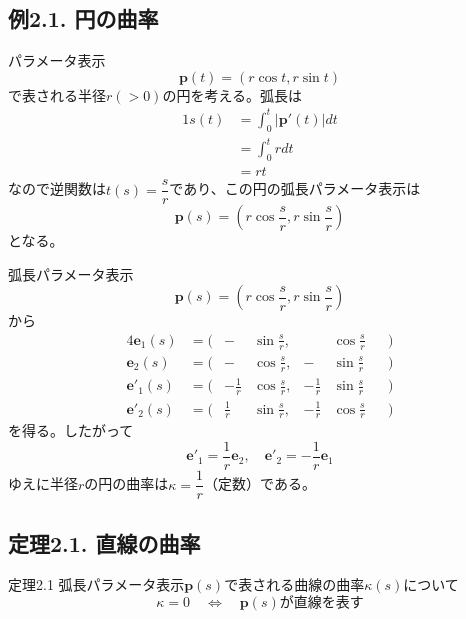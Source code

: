 \documentclass[a4j,disablejfam,dvipdfmx,papersize,slide,uplatex,21pt]{jsarticle}
\begin{document}
\subsection*{例2.1. 円の曲率}
パラメータ表示
\begin{equation}
    \bm{p}(t) = (r \cos t, r \sin t)
\end{equation}
で表される半径$r (> 0)$の円を考える。弧長は
\begin{alignat}{1}
    s(t) &= \int_0^t |\bm{p}'(t)| dt \\
        &= \int_0^t r dt \\
        &= rt
\end{alignat}
なので逆関数は$t(s) = \dfrac{s}{r}$であり、この円の弧長パラメータ表示は
\begin{equation}
    \bm{p}(s) = \left(r \cos \frac{s}{r}, r \sin \frac{s}{r}\right)
\end{equation}
となる。

\newpage
弧長パラメータ表示
\begin{equation}
    \bm{p}(s) = \left(r \cos \frac{s}{r}, r \sin \frac{s}{r}\right)
\end{equation}
から
\begin{alignat}{4}
    \bm{e}_1(s) &=  \bigl(&- &\sin \frac{s}{r},& &\cos \frac{s}{r} &&\bigr) \\
    \bm{e}_2(s) &=  \bigl(&- &\cos \frac{s}{r},& -&\sin \frac{s}{r} &&\bigr) \\
    \bm{e}'_1(s) &= \bigl(&- \frac{1}{r} &\cos \frac{s}{r},& - \frac{1}{r} &\sin \frac{s}{r} &&\bigr) \\
    \bm{e}'_2(s) &= \bigl(&\frac{1}{r} &\sin \frac{s}{r},& - \frac{1}{r} &\cos \frac{s}{r} &&\bigr)
\end{alignat}
を得る。したがって
\begin{equation}
    \bm{e}'_1 = \frac{1}{r} \bm{e}_2,\quad
    \bm{e}'_2 = -\frac{1}{r} \bm{e}_1
\end{equation}
ゆえに半径$r$の円の曲率は$\kappa = \dfrac{1}{r}$（定数）である。

\newpage
\subsection*{定理2.1. 直線の曲率}
\begin{itembox}[l]{定理2.1}
    弧長パラメータ表示$\bm{p}(s)$で表される曲線の曲率$\kappa(s)$について
    \begin{equation}
        \kappa = 0 \quad \Longleftrightarrow \quad \text{$\bm{p}(s)$が直線を表す}
    \end{equation}
\end{itembox}
\end{document}
